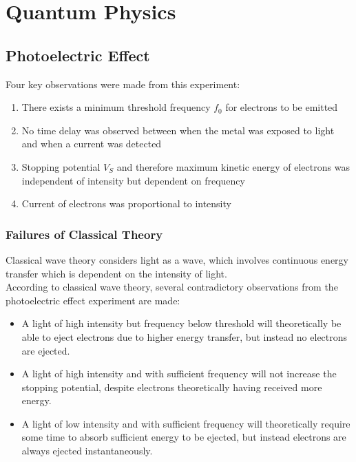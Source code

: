 \documentclass[../main]{subfiles}
\begin{document}
\section{Quantum Physics}

	\subsection{Photoelectric Effect}


	Four key observations were made from this experiment:

	\begin{enumerate}
		\item There exists a minimum threshold frequency \(f_0\) for electrons to be emitted
		\item No time delay was observed between when the metal was exposed to light and when a current was detected
		\item Stopping potential \(V_S\) and therefore maximum kinetic energy of electrons was independent of intensity but dependent on frequency
		\item Current of electrons was proportional to intensity
	\end{enumerate}

	\subsubsection{Failures of Classical Theory}

	Classical wave theory considers light as a wave, which involves continuous energy transfer which is dependent on the intensity of light. \\

	According to classical wave theory, several contradictory observations from the photoelectric effect experiment are made: \\

	\begin{itemize}
	\item A light of high intensity but frequency below threshold will theoretically be able to eject electrons due to higher energy transfer, but instead no electrons are ejected.
	\item A light of high intensity and with sufficient frequency will not increase the stopping potential, despite electrons theoretically having received more energy.
	\item A light of low intensity and with sufficient frequency will theoretically require some time to absorb sufficient energy to be ejected, but instead electrons are always ejected instantaneously.
	\end{itemize}
\end{document}
